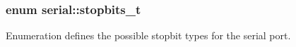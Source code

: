 \subsubsection[{\texorpdfstring{stopbits\+\_\+t}{stopbits_t}}]{\setlength{\rightskip}{0pt plus 5cm}enum {\bf serial\+::stopbits\+\_\+t}}\hypertarget{namespaceserial_af5b116611d6628a3aa8f788fdc09f469}{}\label{namespaceserial_af5b116611d6628a3aa8f788fdc09f469}
Enumeration defines the possible stopbit types for the serial port. 